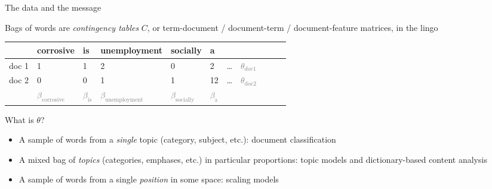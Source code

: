 \documentclass{hertieteaching}
\begin{document}
\begin{frame}{The data and the message}

Bags of words are \textit{contingency tables} $C$, or term-document / document-term / document-feature matrices, in the lingo

\begin{center}
{\small
\begin{tabular}{rllllllllll}\toprule
      & corrosive & is & unemployment & socially & a & & \\ \midrule
doc 1 & 1     & 1  & 2 & 0    & 2    & \ldots & \textcolor{gray}{$\theta_{doc1}$} \\
doc 2 & 0     & 0  & 1 & 1    & 12    & \ldots & \textcolor{gray}{$\theta_\text{doc2}$} \\ \midrule
      & \textcolor{gray}{$\beta_\text{corrosive}$}
      & \textcolor{gray}{$\beta_\text{is}$}
      & \textcolor{gray}{$\beta_\text{unemployment}$}
      & \textcolor{gray}{$\beta_\text{socially}$}
      & \textcolor{gray}{$\beta_\text{a}$} \\ \bottomrule
\end{tabular}
}
\end{center}
What is $\theta$?
\begin{itemize}
  \item A sample of words from a \textit{single} topic (category, subject, etc.): document classification
  \item A mixed bag of \textit{topics} (categories, emphases, etc.) in particular proportions: topic models and dictionary-based content analysis
  \item A sample of words from a single \textit{position} in some space: scaling models
\end{itemize}
  
\end{frame}
\end{document}
